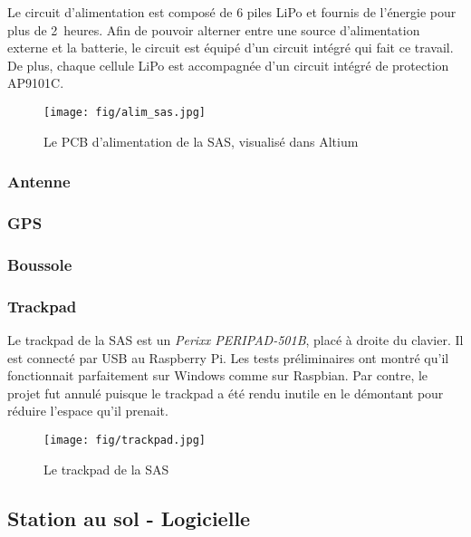 Le circuit d'alimentation est composé de 6 piles LiPo et fournis de l'énergie
pour plus de 2~heures. Afin de pouvoir alterner entre une source d'alimentation
externe et la batterie, le circuit est équipé d'un circuit intégré qui fait ce
travail. De plus, chaque cellule LiPo est accompagnée d'un circuit intégré de
protection AP9101C.

\begin{figure}[H]
	\center
	\texttt{[image: fig/alim\_sas.jpg]}
	\caption{Le PCB d'alimentation de la SAS, visualisé dans Altium}
	\label{f:alim_sas}
\end{figure}

\subsubsection{Antenne}



\subsubsection{GPS}



\subsubsection{Boussole}



\subsubsection{Trackpad}

Le trackpad de la SAS est un \textit{Perixx PERIPAD-501B}, placé à droite du
clavier. Il est connecté par USB au Raspberry Pi. Les tests préliminaires ont
montré qu'il fonctionnait parfaitement sur Windows comme sur Raspbian. Par
contre, le projet fut annulé puisque le trackpad a été rendu inutile en le
démontant pour réduire l'espace qu'il prenait.

\begin{figure}[H]
	\center
	\texttt{[image: fig/trackpad.jpg]}
	\caption{Le trackpad de la SAS}
	\label{f:trackpad}
\end{figure}

\subsection{Station au sol - Logicielle}

